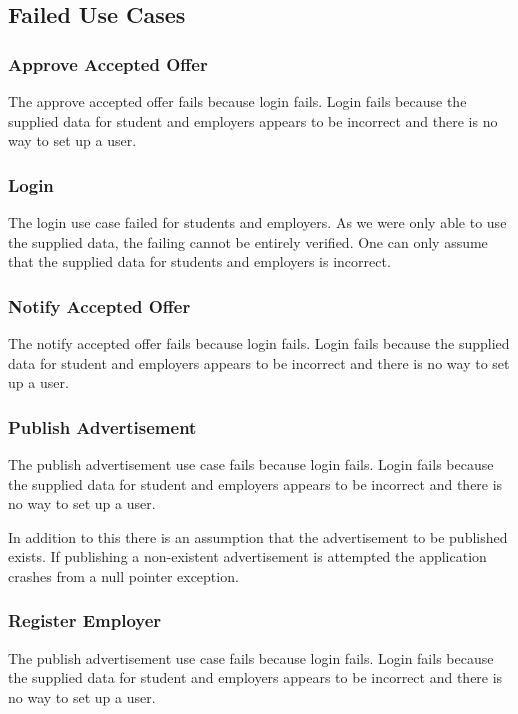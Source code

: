 \documentclass[11pt]{l3deliverable}
\begin{document}
\subsection{Failed Use Cases}

\subsubsection{Approve Accepted Offer}

The approve accepted offer fails because login fails. Login fails because the
supplied data for student and employers appears to be incorrect and there is
no way to set up a user.

\subsubsection{Login}

The login use case failed for students and employers. As we were only able to
use the supplied data, the failing cannot be entirely verified. One can only
assume that the supplied data for students and employers is incorrect.

\subsubsection{Notify Accepted Offer}

The notify accepted offer fails because login fails. Login fails because the
supplied data for student and employers appears to be incorrect and there is
no way to set up a user.

\subsubsection{Publish Advertisement}

The publish advertisement use case fails because login fails. Login fails 
because the supplied data for student and employers appears to be incorrect and 
there is no way to set up a user.

In addition to this there is an assumption that the advertisement to be
published exists. If publishing a non-existent advertisement is attempted the
application crashes from a null pointer exception.

\subsubsection{Register Employer}

The publish advertisement use case fails because login fails. Login fails 
because the supplied data for student and employers appears to be incorrect and 
there is no way to set up a user.
\end{document}
